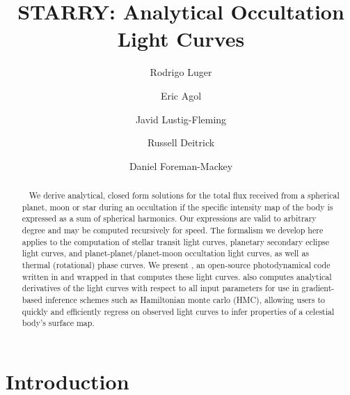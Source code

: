 \documentclass[modern]{aastex61}
\begin{document}

\setlength{\abovedisplayskip}{1.5em}
\setlength{\belowdisplayskip}{1.5em}

\title{%
    \textbf{STARRY}: Analytical Occultation Light Curves
}

\author[0000-0002-0296-3826]{Rodrigo Luger}
\author{Eric Agol}
\author{Javid Lustig-Fleming}
\author{Russell Deitrick}
\author{Daniel Foreman-Mackey}


\begin{abstract}
    We derive analytical, closed form solutions for the total flux
    received from a spherical planet, moon or star during an occultation
    if the specific intensity map of the body is expressed as a
    sum of spherical harmonics. Our expressions are valid to arbitrary degree
    and may be computed recursively for speed. The formalism we develop
    here applies to the computation of stellar transit light curves,
    planetary secondary eclipse light curves, and planet-planet/planet-moon
    occultation light curves, as well as thermal (rotational) phase curves.
    We present \starry, an open-source photodynamical code written in \cpp
    and wrapped in \Python that computes these light curves. \starry also
    computes analytical derivatives of the light curves with respect to all input
    parameters for use in gradient-based inference schemes such as
    Hamiltonian monte carlo (HMC), allowing users to quickly and efficiently
    regress on observed light curves to infer properties of a celestial body's
    surface map.
\end{abstract}

%
\section{Introduction}
\label{sec:intro}
\end{document}
